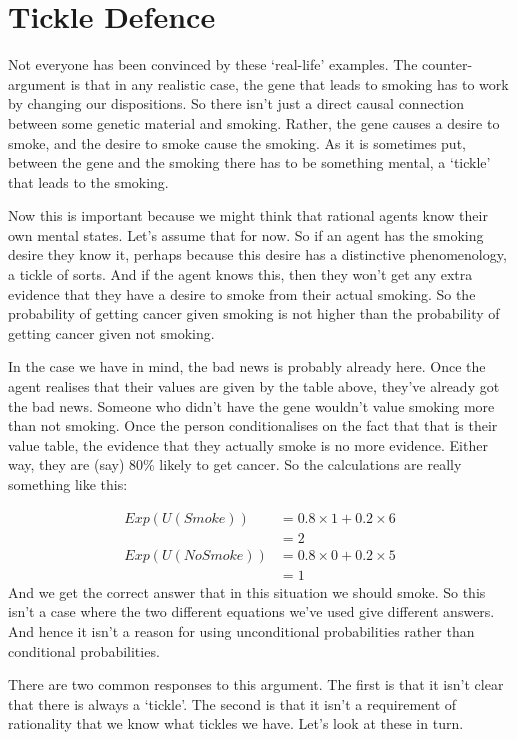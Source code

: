 \section{Tickle Defence}
Not everyone has been convinced by these `real-life' examples. The counter-argument is that in any realistic case, the gene that leads to smoking has to work by changing our dispositions. So there isn't just a direct causal connection between some genetic material and smoking. Rather, the gene causes a desire to smoke, and the desire to smoke cause the smoking. As it is sometimes put, between the gene and the smoking there has to be something mental, a `tickle' that leads to the smoking.

Now this is important because we might think that rational agents know their own mental states. Let's assume that for now. So if an agent has the smoking desire they know it, perhaps because this desire has a distinctive phenomenology, a tickle of sorts. And if the agent knows this, then they won't get any extra evidence that they have a desire to smoke from their actual smoking. So the probability of getting cancer given smoking is not higher than the probability of getting cancer given not smoking.

In the case we have in mind, the bad news is probably already here. Once the agent realises that their values are given by the table above, they've already got the bad news. Someone who didn't have the gene wouldn't value smoking more than not smoking. Once the person conditionalises on the fact that that is their value table, the evidence that they actually smoke is no more evidence. Either way, they are (say) 80\% likely to get cancer. So the calculations are really something like this:

 \begin{align*}
Exp(U(Smoke)) &= 0.8 \times 1 + 0.2 \times 6 \\
  &= 2 \\
 Exp(U(No Smoke)) &= 0.8 \times 0 + 0.2 \times 5 \\
  &= 1
\end{align*}
And we get the correct answer that in this situation we should smoke. So this isn't a case where the two different equations we've used give different answers. And hence it isn't a reason for using unconditional probabilities rather than conditional probabilities.

There are two common responses to this argument. The first is that it isn't clear that there is always a `tickle'. The second is that it isn't a requirement of rationality that we know what tickles we have. Let's look at these in turn.

